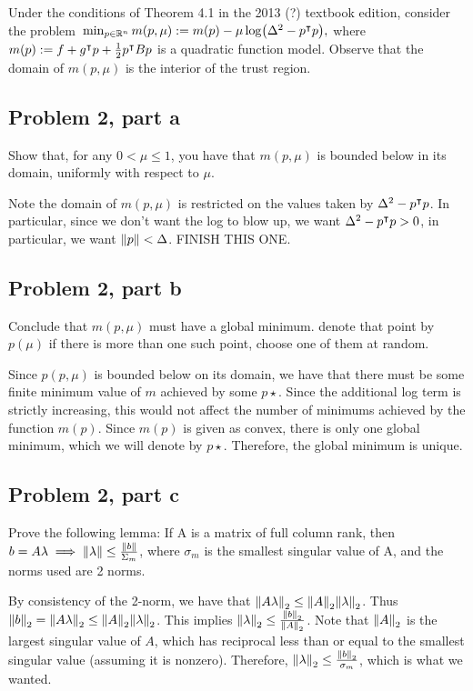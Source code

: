 \jump
Under the conditions of Theorem 4.1 in the 2013 (?) textbook edition, consider the problem $ \\ \min_{p \in \mathbb{R}^n} m(p, \mu) := m(p) - \mu \log (\Delta^2 - p^\intercal p),$ where $m(p) := f + g^\intercal p + \frac{1}{2}p^\intercal Bp$ is a quadratic function model. Observe that the domain of $m(p, \mu)$ is the interior of the trust region.
\subsection{Problem 2, part a}
Show that, for any $0 < \mu \leq 1$, you have that $m(p, \mu)$ is bounded below in its domain, uniformly with respect to $\mu$.
\partbreak
\begin{solution}

    Note the domain of $m(p, \mu)$ is restricted on the values taken by $\Delta ^2 - p^\intercal p$. In particular, since we don't want the log to blow up, we want $\Delta^2 - p^\intercal p > 0$, in particular, we want $\norm{p} < \Delta$. FINISH THIS ONE.
\end{solution}

\newpage
\subsection{Problem 2, part b}
Conclude that $m(p, \mu)$ must have a global minimum. denote that point by $p(\mu)$ if there is more than one such point, choose one of them at random.
\partbreak
\begin{solution}
    
    Since $p(p, \mu)$ is bounded below on its domain, we have that there must be some finite minimum value of $m$ achieved by some $p\star$. Since the additional log term is strictly increasing, this would not affect the number of minimums achieved by the function $m(p)$. Since $m(p)$ is given as convex, there is only one global minimum, which we will denote by $p\star$. Therefore, the global minimum is unique. 
\end{solution}
\subsection{Problem 2, part c}
Prove the following lemma: If A is a matrix of full column rank, then $b = A\mathrm{\lambda} \implies \norm{\mathrm{\lambda}} \leq \frac{\norm{b}}{\Sigma_m}$, where $\sigma_m$ is the smallest singular value of A, and the norms used are 2 norms.
\partbreak
\begin{solution}

    By consistency of the 2-norm, we have that $\norm{A\mathrm{\lambda}}_2 \leq \norm{A}_2\norm{\mathrm{\lambda}}_2$. Thus $\norm{b}_2 = \norm{A\mathrm{\lambda}}_2 \leq \norm{A}_2 \norm{\mathrm{\lambda}}_2$. This implies $\norm{\mathrm{\lambda}}_2 \leq \frac{\norm{b}_2}{\norm{A}_2}$. Note that $\norm{A}_2$ is the largest singular value of $A$, which has reciprocal less than or equal to the smallest singular value (assuming it is nonzero). Therefore,  $\norm{\mathrm{\lambda}}_2 \leq \frac{\norm{b}_2}{\sigma_m}$, which is what we wanted. 
\end{solution}
